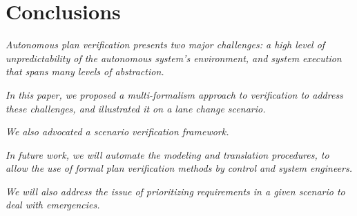 \section{Conclusions}
\label{conclusions}
{\it Autonomous plan verification presents two major challenges: a high level of unpredictability of the autonomous system's environment, and system execution that spans many levels of abstraction.}

{\it In this paper, we proposed a multi-formalism approach to verification to address these challenges, and illustrated it on a lane change scenario.}

{\it We also advocated a scenario verification framework.}

{\it In future work, we will automate the modeling and translation procedures, to allow the use of formal plan verification methods by control and system engineers.}

{\it We will also address the issue of prioritizing requirements in a given scenario to deal with emergencies.}